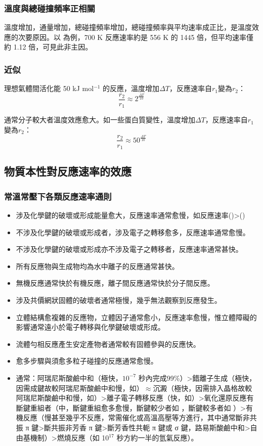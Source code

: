 \documentclass[a4paper,12pt]{article}
\begin{document}
\subsubsection{溫度與總碰撞頻率正相關}
溫度增加，通量增加，總碰撞頻率增加，總碰撞頻率與平均速率成正比，是溫度效應的次要原因。以  為例，700 K 反應速率約是 556 K 的 1445 倍，但平均速率僅約 1.12 倍，可見此非主因。
\subsubsection{近似}
理想氣體間活化能 50 kJ mol$^{-1}$ 的反應，溫度增加$\Delta T$，反應速率自$r_1$變為$r_2$：
\[\frac{r_2}{r_1} \approx 2^{\frac{\Delta T}{10}}\]

通常分子較大者溫度效應愈大。如一些蛋白質變性，溫度增加$\Delta T$，反應速率自$r_1$變為$r_2$：
\[\frac{r_2}{r_1} \approx 50^{\frac{\Delta T}{10}}\]
\subsection{物質本性對反應速率的效應}
\subsubsection{常溫常壓下各類反應速率通則}
\begin{itemize}
\item 涉及化學鍵的破壞或形成能量愈大，反應速率通常愈慢，如反應速率()>()
\item 不涉及化學鍵的破壞或形成者，涉及電子之轉移愈多，反應速率通常愈慢。
\item 不涉及化學鍵的破壞或形成亦不涉及電子之轉移者，反應速率通常甚快。
\item 所有反應物與生成物均為水中離子的反應通常甚快。
\item 無機反應通常快於有機反應，離子間反應通常快於分子間反應。
\item 涉及共價網狀固體的破壞者通常極慢，幾乎無法觀察到反應發生。
\item 立體結構愈複雜的反應物，立體因子通常愈小，反應速率愈慢，惟立體障礙的影響通常遠小於電子轉移與化學鍵破壞或形成。
\item 流體勻相反應產生安定產物者通常較有固體參與的反應快。
\item 愈多步驟與須愈多粒子碰撞的反應通常愈慢。
\item 通常：阿瑞尼斯酸鹼中和（極快，$10^{-7}$ 秒內完成99\%）>錯離子生成（極快，因需成鍵故較阿瑞尼斯酸鹼中和慢，如）$\approx$沉澱（極快，因需排入晶格故較阿瑞尼斯酸鹼中和慢，如）>離子電子轉移反應（快，如）>氧化還原反應有斷鍵重組者（中，斷鍵重組愈多愈慢，斷鍵較少者如 ，斷鍵較多者如 ）>有機反應（慢甚至幾乎不反應，常需催化或高溫高壓等方進行，其中通常斷非共振 π 鍵>斷共振非芳香 π 鍵>斷芳香性共軛 π 鍵或 σ 鍵，路易斯酸鹼中和>自由基機制）>燃燒反應（如  10$^{17}$ 秒方約一半的氫氣反應）。
\end{itemize}
\end{document}
